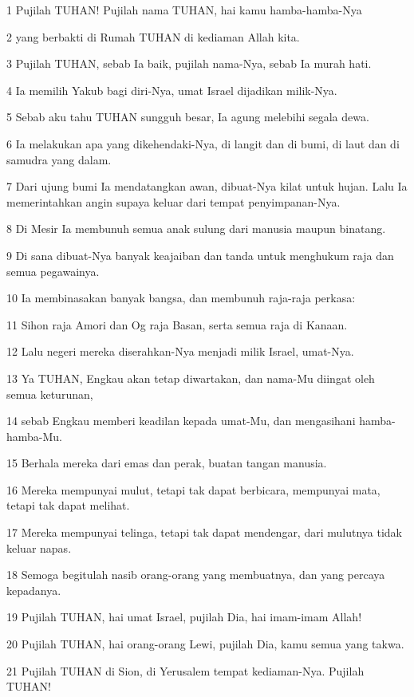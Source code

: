\par 1 Pujilah TUHAN! Pujilah nama TUHAN, hai kamu hamba-hamba-Nya
\par 2 yang berbakti di Rumah TUHAN di kediaman Allah kita.
\par 3 Pujilah TUHAN, sebab Ia baik, pujilah nama-Nya, sebab Ia murah hati.
\par 4 Ia memilih Yakub bagi diri-Nya, umat Israel dijadikan milik-Nya.
\par 5 Sebab aku tahu TUHAN sungguh besar, Ia agung melebihi segala dewa.
\par 6 Ia melakukan apa yang dikehendaki-Nya, di langit dan di bumi, di laut dan di samudra yang dalam.
\par 7 Dari ujung bumi Ia mendatangkan awan, dibuat-Nya kilat untuk hujan. Lalu Ia memerintahkan angin supaya keluar dari tempat penyimpanan-Nya.
\par 8 Di Mesir Ia membunuh semua anak sulung dari manusia maupun binatang.
\par 9 Di sana dibuat-Nya banyak keajaiban dan tanda untuk menghukum raja dan semua pegawainya.
\par 10 Ia membinasakan banyak bangsa, dan membunuh raja-raja perkasa:
\par 11 Sihon raja Amori dan Og raja Basan, serta semua raja di Kanaan.
\par 12 Lalu negeri mereka diserahkan-Nya menjadi milik Israel, umat-Nya.
\par 13 Ya TUHAN, Engkau akan tetap diwartakan, dan nama-Mu diingat oleh semua keturunan,
\par 14 sebab Engkau memberi keadilan kepada umat-Mu, dan mengasihani hamba-hamba-Mu.
\par 15 Berhala mereka dari emas dan perak, buatan tangan manusia.
\par 16 Mereka mempunyai mulut, tetapi tak dapat berbicara, mempunyai mata, tetapi tak dapat melihat.
\par 17 Mereka mempunyai telinga, tetapi tak dapat mendengar, dari mulutnya tidak keluar napas.
\par 18 Semoga begitulah nasib orang-orang yang membuatnya, dan yang percaya kepadanya.
\par 19 Pujilah TUHAN, hai umat Israel, pujilah Dia, hai imam-imam Allah!
\par 20 Pujilah TUHAN, hai orang-orang Lewi, pujilah Dia, kamu semua yang takwa.
\par 21 Pujilah TUHAN di Sion, di Yerusalem tempat kediaman-Nya. Pujilah TUHAN!

